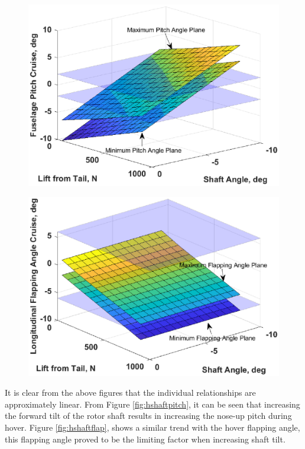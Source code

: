 \documentclass[11pt,a4paper]{article}
\begin{document}
\begin{figure}[H]
\centering
\begin{minipage}{.49\textwidth}
  \centering
  \includegraphics[width=\linewidth]{cruisepitch.eps}
  \label{fig:cruisepitch}
\end{minipage}\hspace{0.2cm}
\begin{minipage}{.49\textwidth}
  \centering
  \includegraphics[width=\linewidth]{cruiseflapping.eps}
  \label{fig:cruiseflap}
\end{minipage}
\end{figure}
It is clear from the above figures that the individual relationships are approximately linear.
From Figure \ref{fig:hshaftpitch}, it can be seen that increasing the forward tilt of the rotor shaft results in increasing the nose-up pitch during hover. Figure \ref{fig:hshaftflap}, shows a similar trend with the hover flapping angle, this flapping angle proved to be the limiting factor when increasing shaft tilt.
\end{document}
